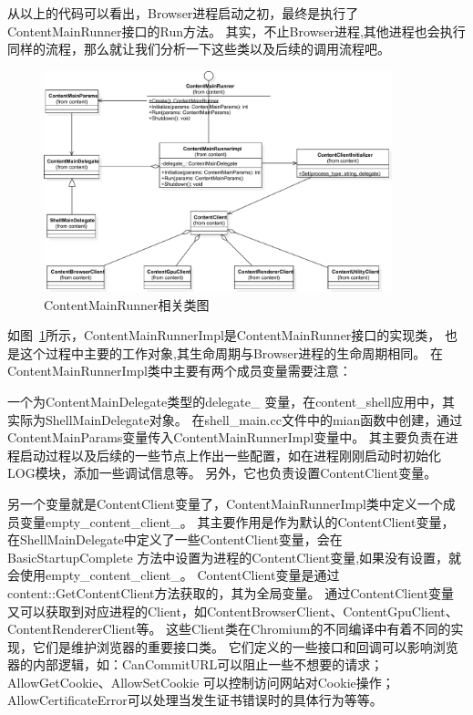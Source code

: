 从以上的代码可以看出，Browser进程启动之初，最终是执行了ContentMainRunner接口的Run方法。
其实，不止Browser进程,其他进程也会执行同样的流程，那么就让我们分析一下这些类以及后续的调用流程吧。

\begin{figure}[H] 
  \centering 
  \includegraphics[width=0.90\textwidth]{image/process_study/ContentMainRunner.pdf} 
  \caption{ContentMainRunner相关类图} \label{fig:ContentMainRunnerClass} 
\end{figure}

如图~\ref{fig:ContentMainRunnerClass}所示，ContentMainRunnerImpl是ContentMainRunner接口的实现类，
也是这个过程中主要的工作对象,其生命周期与Browser进程的生命周期相同。
在ContentMainRunnerImpl类中主要有两个成员变量需要注意：

一个为ContentMainDelegate类型的delegate\_
变量，在content\_shell应用中，其实际为ShellMainDelegate对象。
在shell\_main.cc文件中的mian函数中创建，通过ContentMainParams变量传入ContentMainRunnerImpl变量中。
其主要负责在进程启动过程以及后续的一些节点上作出一些配置，如在进程刚刚启动时初始化LOG模块，添加一些调试信息等。
另外，它也负责设置ContentClient变量。

另一个变量就是ContentClient变量了，ContentMainRunnerImpl类中定义一个成员变量empty\_content\_client\_。
其主要作用是作为默认的ContentClient变量，在ShellMainDelegate中定义了一些ContentClient变量，会在BasicStartupComplete
方法中设置为进程的ContentClient变量,如果没有设置，就会使用empty\_content\_client\_。
ContentClient变量是通过content::GetContentClient方法获取的，其为全局变量。
通过ContentClient变量又可以获取到对应进程的Client，如ContentBrowserClient、ContentGpuClient、ContentRendererClient等。
这些Client类在Chromium的不同编译中有着不同的实现，它们是维护浏览器的重要接口类。
它们定义的一些接口和回调可以影响浏览器的内部逻辑，如：CanCommitURL可以阻止一些不想要的请求；AllowGetCookie、AllowSetCookie
可以控制访问网站对Cookie操作；AllowCertificateError可以处理当发生证书错误时的具体行为等等。

